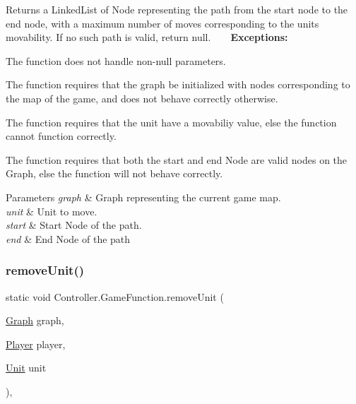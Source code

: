 Returns a Linked\+List of Node representing the path from the start node to the end node, with a maximum number of moves corresponding to the unit\textquotesingle{}s movability. If no such path is valid, return null. ~\newline
~\newline
 {\bfseries Exceptions\+:} ~\newline

\begin{DoxyItemize}
\item The function does not handle non-\/null parameters.
\item The function requires that the graph be initialized with nodes corresponding to the map of the game, and does not behave correctly otherwise.
\item The function requires that the unit have a movabiliy value, else the function cannot function correctly.
\item The function requires that both the start and end Node are valid nodes on the Graph, else the function will not behave correctly. 
\begin{DoxyParams}{Parameters}
{\em graph} & Graph representing the current game map. \\
\hline
{\em unit} & Unit to move. \\
\hline
{\em start} & Start Node of the path. \\
\hline
{\em end} & End Node of the path \\
\hline
\end{DoxyParams}

\end{DoxyItemize}\hypertarget{class_controller_1_1_game_function_a5d44bd8d957c6546f3ecd857433cde25}{}\label{class_controller_1_1_game_function_a5d44bd8d957c6546f3ecd857433cde25} 
\subsubsection{\texorpdfstring{remove\+Unit()}{removeUnit()}}
{\footnotesize\ttfamily static void Controller.\+Game\+Function.\+remove\+Unit (\begin{DoxyParamCaption}\item[{\hyperlink{class_model_1_1_map_module_1_1_graph}{Graph}}]{graph,  }\item[{\hyperlink{class_model_1_1_player}{Player}}]{player,  }\item[{\hyperlink{interface_model_1_1_unit_module_1_1_unit}{Unit}}]{unit }\end{DoxyParamCaption})\hspace{0.3cm}{\ttfamily [inline]}, {\ttfamily [static]}}

